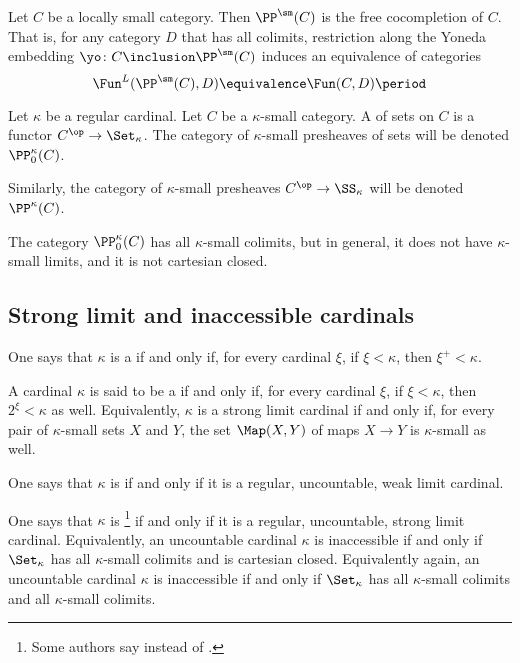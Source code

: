 \begin{proposition}
	Let $ C $ be a locally small category.
	Then $ \PP^{\sm}(C) $ is the free cocompletion of $ C $.
	That is, for any category $ D $ that has all colimits,
	restriction along the Yoneda embedding $ \yo \colon C \inclusion \PP^{\sm}(C) $
	induces an equivalence of categories
	\[
		\Fun^L(\PP^{\sm}(C), D) \equivalence \Fun(C, D) \period
	\]
\end{proposition}

\begin{definition}
	Let $ \kappa $ be a regular cardinal.
	Let $ C $ be a $ \kappa $-small category.
	A  of sets on $ C $ is a functor $ C^{\op} \to \Set_{\kappa} $.
	The category of $ \kappa $-small presheaves of sets will be denoted $ \PP^{\kappa}_0(C) $.

	Similarly, the category of $ \kappa $-small presheaves $ C^{\op} \to \SS_{\kappa} $
	will be denoted $ \PP^{\kappa}(C) $.
\end{definition}

\begin{nul}
	The category $ \PP^{\kappa}_0(C) $ has all $ \kappa $-small colimits, but
	in general, it does not have $ \kappa $-small limits, and
	it is not cartesian closed.
\end{nul}

\subsection{Strong limit and inaccessible cardinals}%
\label{sub:strong_limit_and_inaccessible_cardinals}

\begin{definition}
	One says that $ \kappa $ is a  if and only if,
	for every cardinal $ \xi $,
	if $ \xi < \kappa $, then $ \xi^+ < \kappa $.

	A cardinal $\kappa$ is said to be a  if and only if,
	for every cardinal $ \xi $,
	if $ \xi < \kappa $, then $ 2^{\xi} < \kappa $ as well.
	Equivalently, $ \kappa $ is a strong limit cardinal if and only if,
	for every pair of $ \kappa $-small sets $ X $ and $ Y $,
	the set $ \Map(X, Y) $ of maps $ X \to Y $ is $ \kappa $-small as well. 

	One says that $\kappa$ is  if and only if
	it is a regular, uncountable, weak limit cardinal.

	One says that $\kappa$ is %
	\footnote{Some authors say  instead of .}
	if and only if it is a regular, uncountable, strong limit cardinal.
	Equivalently, an uncountable cardinal $ \kappa $ is inaccessible if and only if
	$ \Set_{\kappa} $ has all $ \kappa $-small colimits and is cartesian closed.
	Equivalently again, an uncountable cardinal $ \kappa $ is inaccessible if and only if 
	$ \Set_{\kappa} $ has all $ \kappa $-small colimits and all $ \kappa $-small colimits.
\end{definition}

